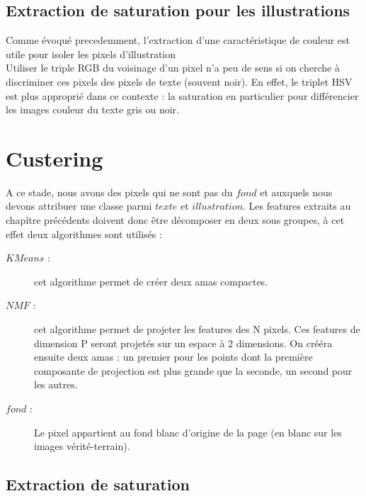 \documentclass{book}
\begin{document}
\section{Extraction de saturation pour les illustrations}

Comme évoqué precedemment, l'extraction d'une caractéristique de couleur est utile pour isoler les pixels d'illustration\\
Utiliser le triple RGB du voisinage d'un pixel n'a peu de sens si on cherche à discriminer ces pixels des pixels de texte (souvent noir).
En effet, le triplet HSV est plus approprié dans ce contexte : la saturation en particulier pour différencier les images couleur du texte gris ou noir.

\chapter{Custering}

A ce stade, nous avons des pixels qui ne sont pas du $fond$ et auxquels nous devons attribuer une classe parmi $texte$ et $illustration$.
Les features extraits au chapître précédents doivent donc être décomposer en deux sous groupes, à cet effet deux algorithmes sont utilisés :
\begin{description} %

\item[$KMeans$ :] cet algorithme permet de créer deux amas compactes.
\item[$NMF$ :] cet algorithme permet de projeter les features des N pixels. Ces features de dimension P seront projetés sur un espace à 2 dimensions. On crééra ensuite
deux amas : un premier pour les points dont la première composante de projection est plus grande que la seconde, un second pour les autres. 
\item[$fond$ :] Le pixel appartient au fond blanc d'origine de la page (en blanc sur les images vérité-terrain).

\end{description}
\section{Extraction de saturation}
\end{document}
